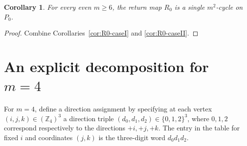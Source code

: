 \documentclass[11pt]{article}
\newtheorem{corollary}{Corollary}
\begin{document}
\begin{corollary}\label{cor:R0-all}
For every even $m\ge 6$, the return map $R_0$ is a single $m^2$-cycle on $P_0$.
\end{corollary}

\begin{proof}
Combine Corollaries~\ref{cor:R0-caseI} and \ref{cor:R0-caseII}.
\end{proof}

\section{An explicit decomposition for $m=4$}\label{app:m4}

For $m=4$, define a direction assignment by specifying at each vertex $(i,j,k)\in(\mathbb Z_4)^3$ a direction triple $(d_0,d_1,d_2)\in\{0,1,2\}^3$, where $0,1,2$ correspond respectively to the directions $+i,+j,+k$.
The entry in the table for fixed $i$ and coordinates $(j,k)$ is the three-digit word $d_0d_1d_2$.
\end{document}
